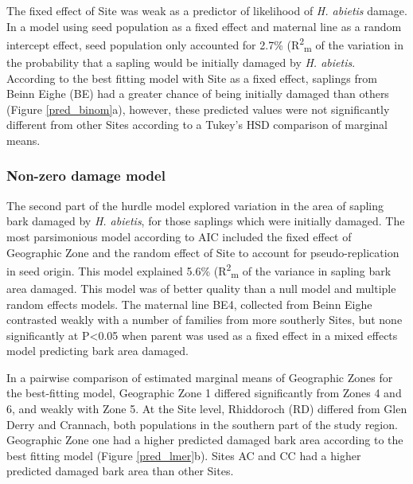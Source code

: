\documentclass[a4paper, 11pt]{article}
\begin{document}


The fixed effect of Site was weak as a predictor of likelihood of \textit{H. abietis} damage. In a model using seed population as a fixed effect and maternal line as a random intercept effect, seed population only accounted for 2.7\% (R\textsuperscript{2}\textsubscript{m} of the variation in the probability that a sapling would be initially damaged by \textit{H. abietis}. According to the best fitting model with Site as a fixed effect, saplings from Beinn Eighe (BE) had a greater chance of being initially damaged than others (Figure \ref{pred_binom}a), however, these predicted values were not significantly different from other Sites according to a Tukey's HSD comparison of marginal means.

\subsubsection*{Non-zero damage model}

The second part of the hurdle model explored variation in the area of sapling bark damaged by \textit{H. abietis}, for those saplings which were initially damaged. The most parsimonious model according to AIC included the fixed effect of Geographic Zone and the random effect of Site to account for pseudo-replication in seed origin. This model explained 5.6\% (R\textsuperscript{2}\textsubscript{m} of the variance in sapling bark area damaged. This model was of better quality than a null model and multiple random effects models. The maternal line BE4, collected from Beinn Eighe contrasted weakly with a number of families from more southerly Sites, but none significantly at P\textless{}0.05 when parent was used as a fixed effect in a mixed effects model predicting bark area damaged.

In a pairwise comparison of estimated marginal means of Geographic Zones for the best-fitting model, Geographic Zone 1 differed significantly from Zones 4 and 6, and weakly with Zone 5. At the Site level, Rhiddoroch (RD) differed from Glen Derry and Crannach, both populations in the southern part of the study region. Geographic Zone one had a higher predicted damaged bark area according to the best fitting model (Figure \ref{pred_lmer}b). Sites AC and CC had a higher predicted damaged bark area than other Sites.
\end{document}
